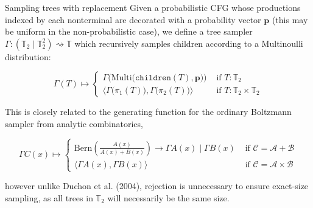 \documentclass{beamer}
\begin{document}
\begin{frame}[fragile]{Sampling trees with replacement}
  Given a probabilistic CFG whose productions indexed by each nonterminal are decorated with a probability vector $\mathbf{p}$ (this may be uniform in the non-probabilistic case), we define a tree sampler $\Gamma: (\mathbb{T}_2 \mid \mathbb{T}_2^2) \rightsquigarrow \mathbb{T}$ which recursively samples children according to a Multinoulli distribution:

  \begin{equation*}
    \Gamma(T) \mapsto \begin{cases}
      \Gamma\Big(\text{Multi} \big(\texttt{children}(T), \mathbf{p}\big)\Big) & \text{ if $T: \mathbb{T}_2$ } \\
      \Big\langle \Gamma\big(\pi_1(T)\big), \Gamma\big(\pi_2(T)\big) \Big\rangle & \text{ if $T: \mathbb{T}_2\times\mathbb{T}_2$}
    \end{cases}
  \end{equation*}

  This is closely related to the generating function for the ordinary Boltzmann sampler from analytic combinatorics,

  \begin{equation*}
    \Gamma C(x) \mapsto \begin{cases}
                          \text{Bern} \left(\frac{A(x)}{A(x) + B(x)}\right) \rightarrow \Gamma A(x) \mid \Gamma B(x) & \text{ if } \mathcal{C}=\mathcal{A}+\mathcal{B} \\
                          \big\langle \Gamma A(x), \Gamma B(x)\big\rangle & \text{ if } \mathcal{C}=\mathcal{A} \times \mathcal{B}
    \end{cases}
  \end{equation*}

  \noindent however unlike Duchon et al. (2004), rejection is unnecessary to ensure exact-size sampling, as all trees in $\mathbb{T}_2$ will necessarily be the same size.
\end{frame}
\end{document}
